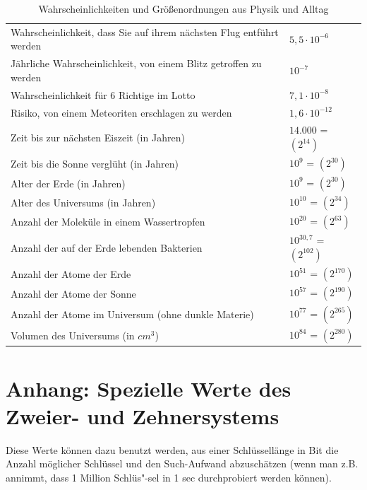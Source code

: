 \begin{refsegment}
\begin{table}[ht]
\begin{center}
\begin{tabular}{|l|l|}\hline
Wahrscheinlichkeit, dass Sie auf ihrem nächsten Flug entführt werden	&  $ 5,5 \cdot 10^{-6} $  \\
Jährliche Wahrscheinlichkeit, von einem Blitz getroffen zu werden	&  $ 10^{-7} $            \\
Wahrscheinlichkeit für 6 Richtige im Lotto				&  $ 7,1 \cdot 10^{-8} $  \\
Risiko, von einem Meteoriten erschlagen zu werden			&  $ 1,6 \cdot 10^{-12} $ \\
\hline
Zeit bis zur nächsten Eiszeit (in Jahren)	&  $14.000 $   =  $(2^{14})$ \\
Zeit bis die Sonne verglüht (in Jahren)	&  $10^{9} $   =  $(2^{30})$ \\
Alter der Erde (in Jahren)			&  $ 10^9 $    =  $(2^{30})$ \\
Alter des Universums (in Jahren)		&  $ 10^{10} $ =  $(2^{34})$ \\
Anzahl der Moleküle in einem Wassertropfen	&  $10^{20} $  =  $(2^{63})$ \\
Anzahl der auf der Erde lebenden Bakterien	&  $10^{30,7} $ = $(2^{102})$ \\
Anzahl der Atome der Erde 			&  $10^{51} $  =  $(2^{170})$ \\
Anzahl der Atome der Sonne			&  $10^{57}$   =  $(2^{190})$ \\
Anzahl der Atome im Universum (ohne dunkle Materie)	&  $10^{77}$  = $(2^{265})$ \\
Volumen des Universums (in $cm^3$)		&  $10^{84}$   = $(2^{280})$ \\ \hline
\end{tabular}
\caption{Wahrscheinlichkeiten und Größenordnungen aus Physik und Alltag}
\end{center}
\end{table}


\section{Anhang: Spezielle Werte des Zweier- und Zehnersystems}

Diese Werte können dazu benutzt werden, aus einer Schlüssellänge in Bit
die Anzahl möglicher Schlüssel und den Such-Aufwand abzuschätzen (wenn man
z.B. annimmt, dass 1 Million Schlüs"-sel in 1 sec durchprobiert werden können).


\end{refsegment}
